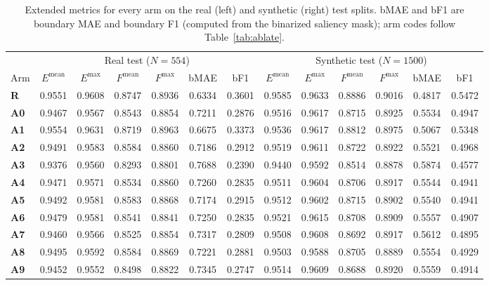 \documentclass[10pt,a4paper,twocolumn,twoside]{article}
\begin{document}
\begin{table}[!t]
\centering
\caption{Extended metrics for every arm on the real (left) and synthetic (right) test splits.
bMAE and bF1 are boundary MAE and boundary F1 (computed from the binarized saliency mask);
arm codes follow Table~\ref{tab:ablate}.}
\label{tab:ext}
\footnotesize
\setlength{\tabcolsep}{3.6pt}
\begin{tabular}{@{}lcccccc@{\hspace{10pt}}cccccc@{}}
\toprule
& \multicolumn{6}{c}{Real test ($N{=}554$)} & \multicolumn{6}{c}{Synthetic test ($N{=}1500$)} \\
\cmidrule(lr){2-7}\cmidrule(lr){8-13}
Arm & $E^{\text{mean}}$ & $E^{\max}$ & $F^{\text{mean}}$ & $F^{\max}$ & bMAE & bF1 & $E^{\text{mean}}$ & $E^{\max}$ & $F^{\text{mean}}$ & $F^{\max}$ & bMAE & bF1 \\
\midrule
\textbf{R} & 0.9551 & 0.9608 & 0.8747 & 0.8936 & 0.6334 & 0.3601 & 0.9585 & 0.9633 & 0.8886 & 0.9016 & 0.4817 & 0.5472 \\
\textbf{A0} & 0.9467 & 0.9567 & 0.8543 & 0.8854 & 0.7211 & 0.2876 & 0.9516 & 0.9617 & 0.8715 & 0.8925 & 0.5534 & 0.4947 \\
\textbf{A1} & 0.9554 & 0.9631 & 0.8719 & 0.8963 & 0.6675 & 0.3373 & 0.9536 & 0.9617 & 0.8812 & 0.8975 & 0.5067 & 0.5348 \\
\textbf{A2} & 0.9491 & 0.9583 & 0.8584 & 0.8860 & 0.7186 & 0.2912 & 0.9519 & 0.9611 & 0.8722 & 0.8922 & 0.5521 & 0.4968 \\
\textbf{A3} & 0.9376 & 0.9560 & 0.8293 & 0.8801 & 0.7688 & 0.2390 & 0.9440 & 0.9592 & 0.8514 & 0.8878 & 0.5874 & 0.4577 \\
\textbf{A4} & 0.9471 & 0.9571 & 0.8534 & 0.8860 & 0.7260 & 0.2835 & 0.9511 & 0.9604 & 0.8706 & 0.8917 & 0.5544 & 0.4941 \\
\textbf{A5} & 0.9492 & 0.9581 & 0.8583 & 0.8868 & 0.7174 & 0.2915 & 0.9512 & 0.9602 & 0.8715 & 0.8902 & 0.5540 & 0.4941 \\
\textbf{A6} & 0.9479 & 0.9581 & 0.8541 & 0.8841 & 0.7250 & 0.2835 & 0.9521 & 0.9615 & 0.8708 & 0.8909 & 0.5557 & 0.4907 \\
\textbf{A7} & 0.9460 & 0.9566 & 0.8525 & 0.8854 & 0.7317 & 0.2809 & 0.9508 & 0.9608 & 0.8692 & 0.8917 & 0.5612 & 0.4895 \\
\textbf{A8} & 0.9495 & 0.9592 & 0.8584 & 0.8869 & 0.7221 & 0.2881 & 0.9503 & 0.9588 & 0.8705 & 0.8889 & 0.5554 & 0.4929 \\
\textbf{A9} & 0.9452 & 0.9552 & 0.8498 & 0.8822 & 0.7345 & 0.2747 & 0.9514 & 0.9609 & 0.8688 & 0.8920 & 0.5559 & 0.4914 \\

\end{tabular}
\end{table}
\end{document}
